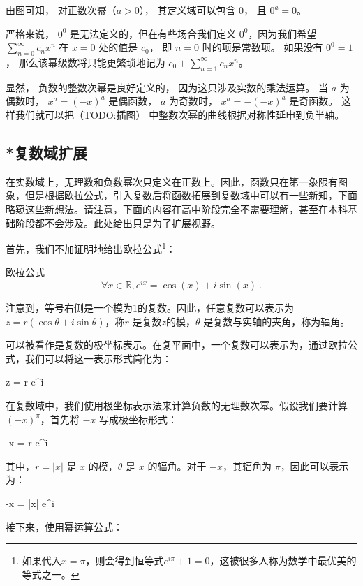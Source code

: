 由图可知， 对正数次幂（$a > 0$）， 其定义域可以包含 $0$， 且 $0^a = 0$。

严格来说， $0^0$ 是无法定义的，但在有些场合我们定义 $0^0$，因为我们希望 $\sum_{n=0}^\infty c_n x^n$ 在 $x = 0$ 处的值是 $c_0$， 即 $n=0$ 时的项是常数项。 如果没有 $0^0 = 1$， 那么该幂级数将只能更繁琐地记为 $c_0 + \sum_{n=1}^\infty c_n x^n$。


显然， 负数的整数次幂是良好定义的， 因为这只涉及实数的乘法运算。 当 $a$ 为偶数时， $x^a = (-x)^a$ 是偶函数， $a$ 为奇数时， $x^a = -(-x)^a$ 是奇函数。 这样我们就可以把（TODO:插图） 中整数次幂的曲线根据对称性延申到负半轴。




\subsection{*复数域扩展}
在实数域上，无理数和负数幂次只定义在正数上。因此，函数只在第一象限有图象，但是根据欧拉公式，引入复数后将函数拓展到复数域中可以有一些新知，下面略窥这些新想法。请注意，下面的内容在高中阶段完全不需要理解，甚至在本科基础阶段都不会涉及。此处给出只是为了扩展视野。

首先，我们不加证明地给出欧拉公式\footnote{如果代入$x=\pi$，则会得到恒等式$e^{i\pi}+1=0$，这被很多人称为数学中最优美的等式之一。}：

\begin{theorem}{欧拉公式}
\begin{equation}
\forall x\in\mathbb{R},e^{ix} = \cos(x) + i\sin(x)~.
\end{equation}
\end{theorem}

注意到，等号右侧是一个模为$1$的复数。因此，任意复数可以表示为 $z = r (\cos \theta + i \sin \theta)$，称$r$ 是复数$z$的模，$\theta$ 是复数与实轴的夹角，称为辐角。

可以被看作是复数的极坐标表示。在复平面中，一个复数可以表示为，通过欧拉公式，我们可以将这一表示形式简化为：

z = r e^{i\theta}


在复数域中，我们使用极坐标表示法来计算负数的无理数次幂。假设我们要计算 $(-x)^\pi$，首先将 $-x$ 写成极坐标形式：

-x = r \cdot e^{i\theta}

其中，$r = |x|$ 是 $x$ 的模，$\theta$ 是 $x$ 的辐角。对于 $-x$，其辐角为 $\pi$，因此可以表示为：

-x = |x| e^{i\pi}

接下来，使用幂运算公式：

